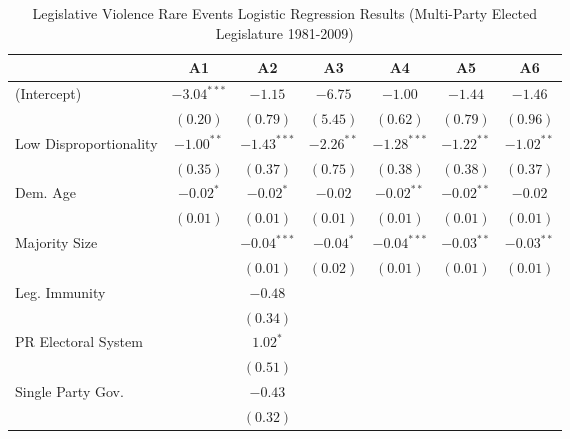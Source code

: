 \documentclass[a4paper]{article}\usepackage[]{graphicx}\usepackage[]{color}
\begin{document}
\begin{table}
\caption{Legislative Violence Rare Events Logistic Regression Results (Multi-Party Elected Legislature 1981-2009)}
\label{outputTable.dem}
\begin{center}

\begin{tabular}{l c c c c c c }
\hline
                        & A1 & A2 & A3 & A4 & A5 & A6 \\
\hline
(Intercept)             & $-3.04^{***}$ & $-1.15$       & $-6.75$      & $-1.00$       & $-1.44$      & $-1.46$      \\
                        & $(0.20)$      & $(0.79)$      & $(5.45)$     & $(0.62)$      & $(0.79)$     & $(0.96)$     \\
Low Disproportionality  & $-1.00^{**}$  & $-1.43^{***}$ & $-2.26^{**}$ & $-1.28^{***}$ & $-1.22^{**}$ & $-1.02^{**}$ \\
                        & $(0.35)$      & $(0.37)$      & $(0.75)$     & $(0.38)$      & $(0.38)$     & $(0.37)$     \\
Dem. Age                & $-0.02^{*}$   & $-0.02^{*}$   & $-0.02$      & $-0.02^{**}$  & $-0.02^{**}$ & $-0.02$      \\
                        & $(0.01)$      & $(0.01)$      & $(0.01)$     & $(0.01)$      & $(0.01)$     & $(0.01)$     \\
Majority Size           &               & $-0.04^{***}$ & $-0.04^{*}$  & $-0.04^{***}$ & $-0.03^{**}$ & $-0.03^{**}$ \\
                        &               & $(0.01)$      & $(0.02)$     & $(0.01)$      & $(0.01)$     & $(0.01)$     \\
Leg. Immunity           &               & $-0.48$       &              &               &              &              \\
                        &               & $(0.34)$      &              &               &              &              \\
PR Electoral System     &               & $1.02^{*}$    &              &               &              &              \\
                        &               & $(0.51)$      &              &               &              &              \\
Single Party Gov.       &               & $-0.43$       &              &               &              &              \\
                        &               & $(0.32)$      &              &               &              &              \\

\end{tabular}
\end{center}
\end{table}
\end{document}
